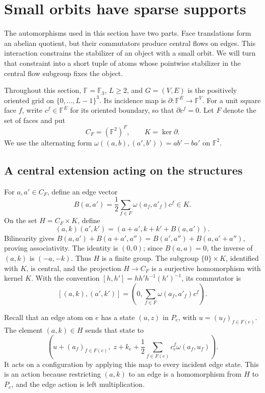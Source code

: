 \section{Small orbits have sparse supports}\label{sec:support}

The automorphisms used in this section have two parts. Face translations
form an abelian quotient, but their commutators produce central flows on
edges. This interaction constrains the stabilizer of an object with a small
orbit. We will turn that constraint into a short tuple of atoms whose
pointwise stabilizer in the central flow subgroup fixes the object.

Throughout this section, $\mathbb F=\mathbb F_3$, $L\ge2$, and $G=(V,E)$ is
the positively oriented grid on $\{0,\ldots,L-1\}^3$. Its incidence map is
$\partial:\mathbb F^E\to\mathbb F^V$. For a unit square face $f$, write
$c^f\in\mathbb F^E$ for its oriented boundary, so that $\partial c^f=0$.
Let $F$ denote the set of faces and put
\[
 C_F=(\mathbb F^2)^F,\qquad K=\ker\partial.
\]
We use the alternating form
$\omega((a,b),(a',b'))=ab'-ba'$ on $\mathbb F^2$.

\subsection{A central extension acting on the structures}

For $a,a'\in C_F$, define an edge vector
\[
 B(a,a')=\frac12\sum_{f\in F}\omega(a_f,a'_f)c^f\in K.
\]
On the set $H=C_F\times K$, define
\begin{equation}\label{eq:H-product}
 (a,k)(a',k')=(a+a',k+k'+B(a,a')).
\end{equation}
Bilinearity gives
$B(a,a')+B(a+a',a'')=B(a',a'')+B(a,a'+a'')$, proving
associativity. The identity is $(0,0)$; since $B(a,a)=0$, the inverse of
$(a,k)$ is $(-a,-k)$. Thus $H$ is a finite group. The subgroup
$\{0\}\times K$, identified with $K$, is central, and the projection
$H\to C_F$ is a surjective homomorphism with kernel $K$. With the convention
$[h,h']=hh'h^{-1}(h')^{-1}$, its commutator is
\begin{equation}\label{eq:H-commutator}
 [(a,k),(a',k')]=\left(0,\sum_{f\in F}
                  \omega(a_f,a'_f)c^f\right).
\end{equation}

Recall that an edge atom on $e$ has a state $(u,z)$ in $P_e$, with
$u=(u_f)_{f\in F(e)}$. The element $(a,k)\in H$ sends that state to
\begin{equation}\label{eq:H-edge-action}
 \left(u+(a_f)_{f\in F(e)},\;
 z+k_e+\frac12\sum_{f\in F(e)}c^f_e\omega(a_f,u_f)\right).
\end{equation}
It acts on a configuration by applying this map to every incident edge
state. This is an action because restricting $(a,k)$ to an edge is a
homomorphism from $H$ to $P_e$, and the edge action is left multiplication.


